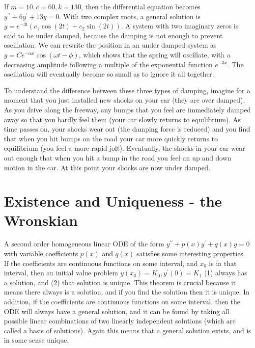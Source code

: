 \begin{example}
If $m=10, c=60, k=130$, then the differential equation becomes  $y^{\prime\prime}+6y^\prime+13y=0$. With two complex roots, a general solution is $y=e^{-3t}(c_1\cos(2t)+c_2\sin(2t))$. A system with two imaginary zeros is said to be under damped, because the damping is not enough to prevent oscillation.   We can rewrite the position in an under damped system as $y=Ce^{-\alpha x}\cos(\omega t-\phi)$, which shows that the spring will oscillate, with a decreasing amplitude following a multiple of the exponential function $e^{-3x}$. The oscillation will eventually become so small as to ignore it all together.
\end{example}


To understand the difference between these three types of damping, imagine for a moment that you just installed new shocks on your car (they are over damped).  As you drive along the freeway, any bumps that you feel are immediately damped away so that you hardly feel them (your car slowly returns to equilibrium).  As time passes on, your shocks wear out (the damping force is reduced) and you find that when you hit bumps on the road your car more quickly returns to equilibrium (you feel a more rapid jolt). Eventually, the shocks in your car wear out enough that when you hit a bump in the road you feel an up and down motion in the car.  At this point your shocks are now under damped.

\section{Existence and Uniqueness - the Wronskian}
A second order homogeneous linear ODE of the form $y^{\prime\prime}+p(x)y^\prime+q(x)y=0$ with variable coefficients $p(x)$ and $q(x)$ satisfies some interesting properties. If the coefficients are continuous functions on some interval, and $x_0$ is in that interval, then an initial value problem $y(x_0)=K_0, y^\prime(0)=K_1$ (1) always has a solution, and (2) that solution is unique. This theorem is crucial because it means there always is a solution, and if you find the solution then it is unique.  In addition, if the coefficients are continuous functions on some interval, then the ODE will always have a general solution, and it can be found by taking all possible linear combinations of two linearly independent solutions (which are called a basis of solutions).  Again this means that a general solution exists, and is in some sense unique.

